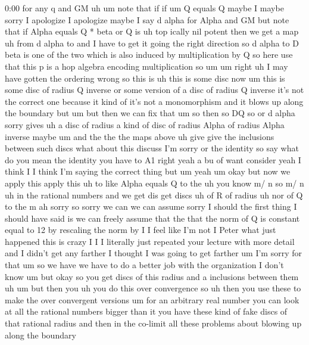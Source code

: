 \begin{unfinished}{0:00}
for  any  q  and
GM
uh
um  note  that
if  if  um  Q  equals
Q  maybe  I  maybe  sorry  I  apologize  I
apologize  maybe  I  say  d  alpha  for  Alpha
and  GM  but  note  that  if  Alpha  equals  Q  *
beta  or  Q  is  uh  top  ically  nil
potent  then  we  get  a
map  uh  from  d
alpha  to  and  I  have  to  get  it  going  the
right  direction  so  d  alpha  to  D  beta  is
one  of  the  two  which  is  also  induced  by
multiplication  by  Q  so  here  use  that
this  p  is  a  hop
algebra  encoding  multiplication
so  um
um  right  uh  I  may  have  gotten  the
ordering
wrong  so  this  is  uh  this  is  some  disc
now
um  this  is  some  disc  of  radius  Q  inverse
or  some  version  of  a  disc  of  radius  Q
inverse  it's  not  the  correct  one  because
it  kind  of  it's  not  a  monomorphism  and
it  blows  up  along  the  boundary  but  um
but  then  we  can  fix  that
um  so  then  so  DQ  so  or  d  alpha  sorry
gives  uh  a  disc  of  radius  a  kind  of  disc
of  radius
Alpha  of  radius  Alpha  inverse
maybe  um  and  the  the  the  maps
above  uh  give  give  the  inclusions
between  such
discs
what  about  this
discuss  I'm
sorry  or  the  identity  so  say  what  do  you
mean  the
identity  you
have  to  A1  right
yeah  a  bu  of
want
consider  yeah  I  think  I  I  think  I'm
saying  the  correct  thing  but  um
yeah  um  okay  but  now  we  apply  this  apply
this  uh  to  like  Alpha  equals  Q  to  the  uh
you  know  m/  n  so  m/  n  uh  in  the  rational
numbers  and  we  get  dis
get  discs  uh  of  R  of
radius  uh  nor  of  Q  to  the  m  ah  sorry  so
sorry  we  can  we  can  assume  sorry  I
should  the  first  thing  I  should  have
said  is  we  can  freely  assume  that
the  that  the  norm  of  Q  is  constant  equal
to  12  by  rescaling  the  norm
by  I  I  feel  like  I'm  not  I  Peter  what
just  happened  this  is  crazy  I  I  I
literally  just  repeated  your  lecture
with  more  detail  and  I  didn't  get  any
farther  I  thought  I  was  going  to  get
farther  um  I'm  sorry  for  that  um  so  we
have  we  have  to  do  a  better  job  with  the
organization  I  don't  know  um  but  okay  so
you  get  discs  of  this  radius  and  a
inclusions  between
them
uh
um  but  then  you  uh  you  do  this  over
convergence  so  uh  then  you  use  these  to
make  the  over  convergent
versions  um  for  an  arbitrary  real  number
you  can  look  at  all  the  rational  numbers
bigger  than  it  you  have  these  kind  of
fake  discs  of  that  rational  radius  and
then  in  the  co-limit  all  these  problems
about  blowing  up  along  the  boundary

\end{unfinished}

